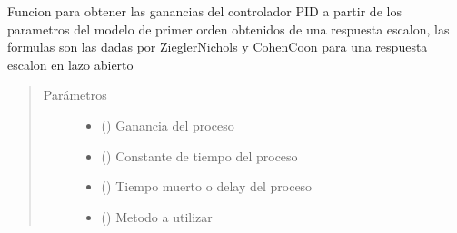 \documentclass[letterpaper,10pt,spanish]{sphinxmanual}
\begin{document}

\begin{fulllineitems}
\label{\detokenize{codigos/rutinas_CSV:rutinas_CSV.auto_tuning_method_csv}}
Funcion para obtener las ganancias del controlador PID a partir de los parametros del modelo de primer orden obtenidos de una respuesta escalon, las formulas son las dadas por Ziegler\sphinxhyphen{}Nichols y Cohen\sphinxhyphen{}Coon para una respuesta escalon en lazo abierto
\begin{quote}\begin{description}
\item[{Parámetros}] \leavevmode\begin{itemize}
\item {} 
 () \textendash{} Ganancia del proceso

\item {} 
 () \textendash{} Constante de tiempo del proceso

\item {} 
 () \textendash{} Tiempo muerto o delay del proceso

\item {} 
 () \textendash{} Metodo a utilizar

\end{itemize}

\end{description}\end{quote}

\end{fulllineitems}

\end{document}
